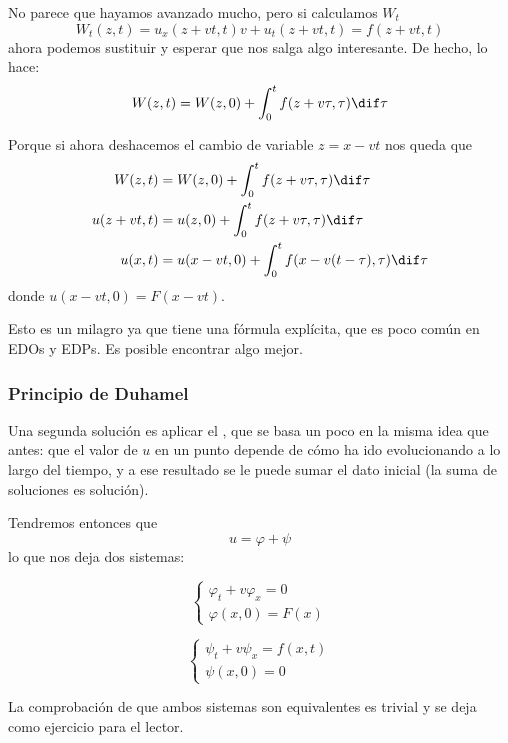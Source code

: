 			No parece que hayamos avanzado mucho, pero si calculamos $W_t$ \[
				W_t(z,t) = u_x(z + vt, t)v + u_t(z+vt, t) = f(z + vt, t)
			\] ahora podemos sustituir y esperar que nos salga algo interesante. De hecho, lo hace:
			\[ W(z,t) = W(z,0) + \int^{t}_{0} f(z+v\tau, \tau)\dif\tau \]

			Porque si ahora deshacemos el cambio de variable $z = x -vt$ nos queda que \begin{align}
			W(z,t) &= W(z,0) + \int^{t}_{0} f(z+v\tau, \tau)\dif\tau \nonumber \\
			u(z + vt, t) &= u(z,0) + \int^{t}_{0} f(z+v\tau, \tau) \dif \tau \nonumber \\
			u(x,t) &= u(x-vt,0)+ \int^{t}_{0} f(x-v(t-\tau),\tau) \dif \tau \label{eq:ModeloCombinado}
			\end{align} donde $u(x-vt,0) = F(x-vt)$.

			Esto es un milagro ya que tiene una fórmula explícita, que es poco común en EDOs y EDPs. Es posible encontrar algo mejor.

		\subsubsection{Principio de Duhamel}
		\label{sec:PrincipioDuhamel}

			Una segunda solución es aplicar el , que se basa un poco en la misma idea que antes: que el valor de $u$ en un punto depende de cómo ha ido evolucionando a lo largo del tiempo, y a ese resultado se le puede sumar el dato inicial (la suma de soluciones es solución).

			Tendremos entonces que \[ u = \varphi + \psi \] lo que nos deja dos sistemas:

			\begin{minipage}{.5\linewidth}
				\[
				\begin{cases*}
					\varphi_t + v\varphi_x = 0\\
					\varphi(x,0) = F(x)
				\end{cases*}
				\]
			\end{minipage}
			\begin{minipage}{.5\linewidth}
				\[
				\begin{cases*}
					\psi_t + v\psi_x = f(x,t) \\
					\psi(x,0) = 0
				\end{cases*}
				\]
			\end{minipage}

			La comprobación de que ambos sistemas son equivalentes es trivial y se deja como ejercicio para el lector.

